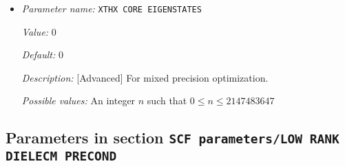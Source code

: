 \begin{itemize}
{\it Default:} 400


{\it Description:} [Advanced]  This parameter specifies the block size of the wavefunction matrix to be used for memory optimization purposes in the orthogonalization, Rayleigh-Ritz, and density computation steps. The optimum block size is dependent on the computing architecture. For optimum work sharing during band parallelization (NPBAND > 1), we recommend adjusting WFC BLOCK SIZE and NUMBER OF KOHN-SHAM WAVEFUNCTIONS such that NUMBER OF KOHN-SHAM WAVEFUNCTIONS/NPBAND/WFC BLOCK SIZE equals an integer value. Default value is 400.


{\it Possible values:} An integer $n$ such that $1\leq n \leq 2147483647$
\item {\it Parameter name:} {\tt XTHX CORE EIGENSTATES}
\label{parameters:SCF parameters/Eigen_2dsolver parameters/XTHX CORE EIGENSTATES}
\label{parameters:SCF_20parameters/Eigen_2dsolver_20parameters/XTHX_20CORE_20EIGENSTATES}


{\it Value:} 0


{\it Default:} 0


{\it Description:} [Advanced] For mixed precision optimization.


{\it Possible values:} An integer $n$ such that $0\leq n \leq 2147483647$
\end{itemize}

\subsection{Parameters in section \tt SCF parameters/LOW RANK DIELECM PRECOND}
\label{parameters:SCF_20parameters/LOW_20RANK_20DIELECM_20PRECOND}

